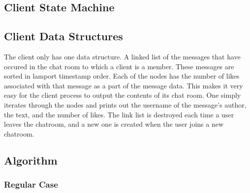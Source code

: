 \documentclass[12pt,journal,compsoc]{IEEEtran}
\begin{document}
\subsection{Client State Machine}

\subsection{Client Data Structures}
The client only has one data structure. A linked list of the messages that have occured in the chat room to which a client is a member. These messages are sorted in lamport timestamp order. Each of the nodes has the number of likes associated with that message as a part of the message data. This makes it very easy for the client process to output the contents of its chat room. One simply iterates through the nodes and prints out the username of the message's author, the text, and the number of likes.  The link list is destroyed each time a user leaves the chatroom, and a new one is created when the user joins a new chatroom.

\subsection{Algorithm}

\subsubsection{Regular Case}
\end{document}
